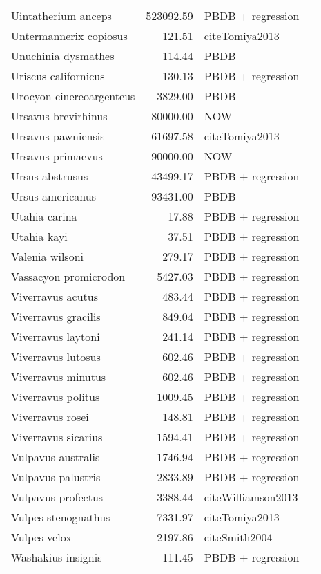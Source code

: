 \begin{table}[ht]
\begin{tabular}{lrll}
  Uintatherium anceps & 523092.59 & PBDB + regression &  \\ 
  Untermannerix copiosus & 121.51 & cite{Tomiya2013} &  \\ 
  Unuchinia dysmathes & 114.44 & PBDB &  \\ 
  Uriscus californicus & 130.13 & PBDB + regression &  \\ 
  Urocyon cinereoargenteus & 3829.00 & PBDB &  \\ 
  Ursavus brevirhinus & 80000.00 & NOW &  \\ 
  Ursavus pawniensis & 61697.58 & cite{Tomiya2013} &  \\ 
  Ursavus primaevus & 90000.00 & NOW &  \\ 
  Ursus abstrusus & 43499.17 & PBDB + regression &  \\ 
  Ursus americanus & 93431.00 & PBDB &  \\ 
  Utahia carina & 17.88 & PBDB + regression &  \\ 
  Utahia kayi & 37.51 & PBDB + regression &  \\ 
  Valenia wilsoni & 279.17 & PBDB + regression &  \\ 
  Vassacyon promicrodon & 5427.03 & PBDB + regression &  \\ 
  Viverravus acutus & 483.44 & PBDB + regression &  \\ 
  Viverravus gracilis & 849.04 & PBDB + regression &  \\ 
  Viverravus laytoni & 241.14 & PBDB + regression &  \\ 
  Viverravus lutosus & 602.46 & PBDB + regression &  \\ 
  Viverravus minutus & 602.46 & PBDB + regression &  \\ 
  Viverravus politus & 1009.45 & PBDB + regression &  \\ 
  Viverravus rosei & 148.81 & PBDB + regression &  \\ 
  Viverravus sicarius & 1594.41 & PBDB + regression &  \\ 
  Vulpavus australis & 1746.94 & PBDB + regression &  \\ 
  Vulpavus palustris & 2833.89 & PBDB + regression &  \\ 
  Vulpavus profectus & 3388.44 & cite{Williamson2013} &  \\ 
  Vulpes stenognathus & 7331.97 & cite{Tomiya2013} &  \\ 
  Vulpes velox & 2197.86 & cite{Smith2004} &  \\ 
  Washakius insignis & 111.45 & PBDB + regression &  \\ 

\end{tabular}
\end{table}
